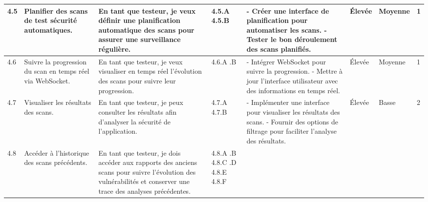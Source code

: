 \begin{landscape}
\begin{spacing}{0.94}
\begin{longtable}{|p{0.6cm}|p{2.6cm}|p{4.9cm}|p{0.97cm}|p{8.6cm}|p{0.35cm}|p{0.35cm}|p{1.6cm}|}
            4.5 & Planifier des scans  de test sécurité automatiques. 
                & En tant que testeur, je veux définir une planification automatique des scans pour assurer une surveillance régulière. & 4.5.A \newline\vspace{0.5cm} 4.5.B  &
                - Créer une interface de planification pour automatiser les scans. \newline
                - Tester le bon déroulement des scans planifiés. & Élevée & Moyenne & 1 \\ \hline
                
            4.6 & Suivre la progression du scan en temps réel via WebSocket. 
                & En tant que testeur, je veux visualiser en temps réel l’évolution des scans pour suivre leur progression.
                & 4.6.A \newline 4.6.B &
                - Intégrer WebSocket pour suivre la progression. \newline
                - Mettre à jour l'interface utilisateur avec des informations en temps réel.  & Élevée & Moyenne & 1 \\ \hline            
            4.7 & Visualiser les résultats des scans. 
                    & En tant que testeur, je peux consulter les résultats afin d'analyser la sécurité de l'application. 
                    & 4.7.A \newline\vspace{0.5cm} 4.7.B
                    & 
                    - Implémenter une interface pour visualiser les résultats des scans. \newline
                    - Fournir des options de filtrage pour faciliter l'analyse des résultats. 
                    & Élevée & Basse & 2 \\
                \hline
            4.8 & Accéder à l’historique des scans précédents. 
                    & En tant que testeur, je dois accéder aux rapports des anciens scans pour suivre l'évolution des vulnérabilités et conserver une trace des analyses précédentes.
                    & 4.8.A 
                    \newline 4.8.B
                    \newline\vspace{0.5cm} 4.8.C
                    \newline 4.8.D
                    \newline\vspace{0.4cm} 4.8.E
                    \newline\vspace{0.5cm} 4.8.F

\end{longtable}
\end{spacing}
\end{landscape}
